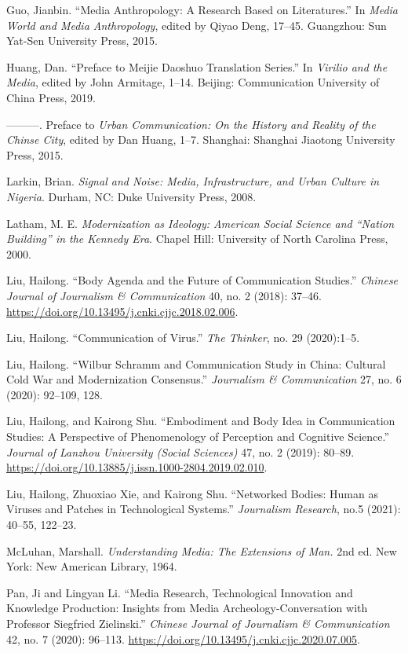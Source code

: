\documentclass{tufte-handout}
\begin{document}
\begin{hangparas}{.25in}{1} 



Guo, Jianbin. ``Media Anthropology: A Research Based on Literatures.''
In \emph{Media World and Media Anthropology}, edited by Qiyao Deng,
17--45. Guangzhou: Sun Yat-Sen University Press, 2015.

Huang, Dan. ``Preface to Meijie Daoshuo Translation Series.'' In
\emph{Virilio and the Media}, edited by John Armitage, 1--14. Beijing:
Communication University of China Press, 2019.

---------. Preface to \emph{Urban Communication: On the History and
Reality of the Chinse City}, edited by Dan Huang, 1--7. Shanghai:
Shanghai Jiaotong University Press, 2015.

Larkin, Brian. \emph{Signal and Noise: Media, Infrastructure, and Urban
Culture in Nigeria}. Durham, NC: Duke University Press, 2008.

Latham, M. E. \emph{Modernization as Ideology: American Social Science
and ``Nation Building'' in the Kennedy Era}. Chapel Hill: University of
North Carolina Press, 2000.

Liu, Hailong. ``Body Agenda and the Future of Communication Studies.''
\emph{Chinese Journal of Journalism \& Communication} 40, no. 2 (2018):
37--46. \url{https://doi.org/10.13495/j.cnki.cjjc.2018.02.006}.

Liu, Hailong. ``Communication of Virus.'' \emph{The Thinker}, no. 29
(2020):1--5.

Liu, Hailong. ``Wilbur Schramm and Communication Study in China:
Cultural Cold War and Modernization Consensus.'' \emph{Journalism \&
Communication} 27, no. 6 (2020): 92--109, 128.

Liu, Hailong, and Kairong Shu. ``Embodiment and Body Idea in
Communication Studies: A Perspective of Phenomenology of Perception and
Cognitive Science.'' \emph{Journal of Lanzhou University (Social
Sciences)} 47, no. 2 (2019): 80--89.
\url{https://doi.org/10.13885/j.issn.1000-2804.2019.02.010}.

Liu, Hailong, Zhuoxiao Xie, and Kairong Shu. ``Networked Bodies: Human
as Viruses and Patches in Technological Systems.'' \emph{Journalism
Research}, no.5 (2021): 40--55, 122--23.

McLuhan, Marshall. \emph{Understanding Media: The Extensions of Man.}
2nd ed. New York: New American Library, 1964.

Pan, Ji and Lingyan Li. ``Media Research, Technological Innovation and
Knowledge Production: Insights from Media Archeology-Conversation with
Professor Siegfried Zielinski.'' \emph{Chinese Journal of Journalism \&
Communication} 42, no. 7 (2020): 96--113.
\url{https://doi.org/10.13495/j.cnki.cjjc.2020.07.005}.


\end{hangparas}
\end{document}
